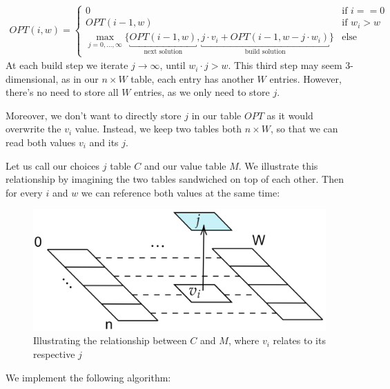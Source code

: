 \begin{align*}
    OPT(i, w) =
    \begin{cases}
        0 & \text{if $i==0$}\\
        OPT(i-1, w) & \text{if $w_i > w$}\\
        {\displaystyle \max_{j = 0, \dots, \infty}}\{\underbracket{OPT(i-1, w)}_{\text{next solution}}, \underbracket{j\cdot v_i+OPT(i-1, w-j\cdot w_i)}_{\text{build solution}}\} & \text{else}
    \end{cases}
\end{align*}
At each build step we iterate $j\to\infty$, until $w_i\cdot j > w$. This third step may seem 3-dimensional, as in 
our $n\times W$ table, each entry has another $W$ entries. However, there's no need to store all $W$ entries, as we only 
need to store $j$.

Moreover, we don't want to directly store $j$ in our table $OPT$ as it would overwrite the $v_i$ value. 
Instead, we keep two tables both $n\times W$, so that we can read both values $v_i$ and its $j$.

\newpage

\noindent
Let us call our choices $j$ table $C$ and our value table $M$. We illustrate this relationship
by imagining the two tables sandwiched on top of each other. Then for every $i$ and $w$ we can reference both values at the same time:

\begin{figure}[h]
    \centering
    \includegraphics[width=.5\textwidth]{Sections/dp/sandwich.png}
    \caption{Illustrating the relationship between $C$ and $M$, where $v_i$ relates to its respective $j$} 
    
\end{figure}

\noindent
We implement the following algorithm:

